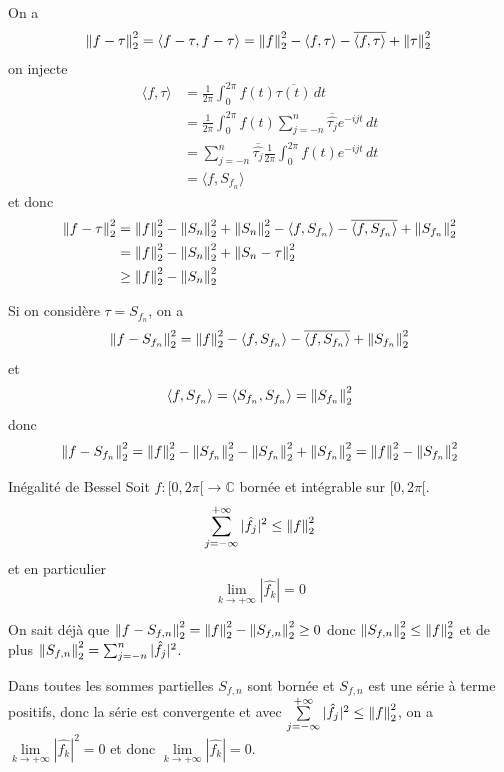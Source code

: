 \documentclass[a4paper,12pt]{article}
\begin{document}
\begin{demonstration}
    On a 
    $$
    \left\lVert f - \tau\right\rVert_2^2 = \langle f - \tau, f - \tau \rangle = \left\lVert f\right\rVert_2^2 - \langle f, \tau \rangle - \overline{\langle f, \tau \rangle} + \left\lVert\tau\right\rVert_2^2 \\
    $$
    on injecte
    \begin{align*}
        \langle f, \tau \rangle &= \frac{1}{2\pi} \int_0^{2\pi} f(t) \overline{\tau(t)} \, dt \\
        &= \frac{1}{2\pi} \int_0^{2\pi} f(t) \sum_{j=-n}^n \overline{\hat{\tau_j}} e^{-ijt} \, dt \\
        &= \sum_{j=-n}^n \overline{\hat{\tau_j}} \frac{1}{2\pi} \int_0^{2\pi} f(t) e^{-ijt} \, dt \\
        &= \langle f, S_{f_n} \rangle
    \end{align*}
    et donc
    \begin{align*}  
        \left\lVert f - \tau\right\rVert_2^2 &= \left\lVert f\right\rVert_2^2 - \left\lVert S_n\right\rVert_2^2 + \left\lVert S_n\right\rVert_2^2 - \langle f, S_{f_n} \rangle - \overline{\langle f, S_{f_n} \rangle} + \left\lVert S_{f_n}\right\rVert_2^2 \\
        &= \left\lVert f\right\rVert_2^2 - \left\lVert S_n\right\rVert_2^2 + \left\lVert S_n - \tau\right\rVert_2^2 \\
        &\geq \left\lVert f\right\rVert_2^2 - \left\lVert S_n\right\rVert_2^2
    \end{align*}

    Si on considère $\tau = S_{f_n}$, on a
    $$
    \left\lVert f - S_{f_n}\right\rVert_2^2 = \left\lVert f\right\rVert_2^2 - \langle f, S_{f_n} \rangle - \overline{\langle f, S_{f_n} \rangle} + \left\lVert S_{f_n}\right\rVert_2^2
    $$
    et
    $$
    \langle f, S_{f_n} \rangle = \langle S_{f_n}, S_{f_n} \rangle = \left\lVert S_{f_n}\right\rVert_2^2
    $$
    donc
    $$
    \left\lVert f - S_{f_n}\right\rVert_2^2 = \left\lVert f\right\rVert_2^2 - \left\lVert S_{f_n}\right\rVert_2^2 - \left\lVert S_{f_n}\right\rVert_2^2 + \left\lVert S_{f_n}\right\rVert_2^2 = \left\lVert f\right\rVert_2^2 - \left\lVert S_{f_n}\right\rVert_2^2
    $$
\end{demonstration}

\begin{corollaire}{Inégalité de Bessel}{}
    Soit $f: [0, 2\pi[ \to \mathbb{C}$ bornée et intégrable sur $[0, 2\pi[$.
    $$
    \sum_{j=-\infty}^{+\infty} |\hat{f_j}|^2 \leq \left\lVert f\right\rVert_2^2
    $$
    et en particulier
    $$
    \lim_{k \to +\infty} |\hat{f_k}| = 0
    $$
\end{corollaire}

\begin{demonstration}

    On sait déjà que $\left\lVert f - S_{f,n}\right\rVert_2^2 = \left\lVert f\right\rVert_2^2 - \left\lVert S_{f,n}\right\rVert_2^2 \geq 0$
    donc $\left\lVert S_{f,n}\right\rVert_2^2 \leq \left\lVert f\right\rVert_2^2$ et de plus $\left\lVert S_{f,n}\right\rVert_2^2 = \sum_{j=-n}^n |\hat{f_j}|^2$.

    Dans toutes les sommes partielles $S_{f,n}$ sont bornée et $S_{f,n}$ est une série à terme positifs,
    donc la série est convergente et avec $\sum\limits_{j=-\infty}^{+\infty} |\hat{f_j}|^2 \leq \left\lVert f\right\rVert_2^2$, on a $\lim\limits_{k \to +\infty} |\hat{f_k}|^2 = 0$ et donc $\lim\limits_{k \to +\infty} |\hat{f_k}| = 0$.
\end{demonstration}
\end{document}
